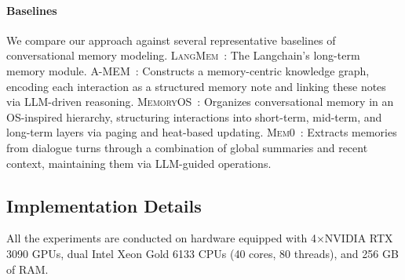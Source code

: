 \paragraph{Baselines}
We compare our approach against several representative baselines of conversational memory modeling. 
 \textsc{LangMem}~\citep{LangMemBlog}: The Langchain's long-term memory module.
 \textsc{A-MEM}~\citep{Xu2025AMEMAM}: Constructs a memory-centric knowledge graph, encoding each interaction as a structured memory note and linking these notes via LLM-driven reasoning.
 \textsc{MemoryOS}~\citep{Kang2025MemoryOO}: Organizes conversational memory in an OS-inspired hierarchy, structuring interactions into short-term, mid-term, and long-term layers via paging and heat-based updating.
 \textsc{Mem0}~\citep{Chhikara2025Mem0BP}: Extracts memories from dialogue turns through a combination of global summaries and recent context, maintaining them via LLM-guided operations.




\subsection{Implementation Details}
All the experiments are conducted on hardware equipped with 4×NVIDIA RTX 3090 GPUs, dual Intel Xeon Gold 6133 CPUs (40 cores, 80 threads), and 256 GB of RAM.
